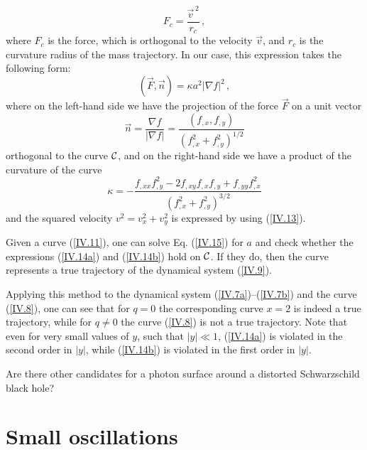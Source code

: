 \documentclass[twocolumn,showpacs,preprintnumbers,amsmath,amssymb,floatfix,nofootinbib]{revtex4-1}
\newcommand{\be}{\begin{equation}}
\newcommand{\ee}{\end{equation}}
\newcommand{\eq}[1]{(\ref{#1})}
\newcommand{\n}[1]{\label{#1}}
\begin{document}
\be\n{IV.16}
F_{c}=\frac{\vec{v}^{\,2}}{r_{c}}\,,
\ee
where $F_{c}$ is the force, which is orthogonal to the velocity $\vec{v}$, and $r_{c}$ is the curvature radius of the mass trajectory. In our case, this expression takes the following form:
\be\n{IV.17}
(\vec{F},\vec{n})=\kappa a^2|\nabla f|^2\,,
\ee
where on the left-hand side we have the projection of the force $\vec{F}$ on a unit vector 
\be\n{IV.18}
\vec{n}=\frac{\nabla f}{|\nabla f|}=\frac{(f_{,x}, f_{,y})}{(f_{,x}^2+f_{,y}^2)^{1/2}}
\ee
orthogonal to the curve ${\cal C}$, and on the right-hand side we have a product of the curvature of the curve 
\be\n{IV.19}
\kappa=-\frac{f_{,xx}f_{,y}^2-2f_{,xy}f_{,x}f_{,y}+f_{,yy}f_{,x}^2}{(f_{,x}^2+f_{,y}^2)^{3/2}} 
\ee
and the squared velocity $v^2=v_x^2+v_y^2$ is expressed by using \eq{IV.13}.

Given a curve \eq{IV.11}, one can solve Eq. \eq{IV.15} for $a$ and check whether the expressions \eq{IV.14a} and \eq{IV.14b} hold on ${\cal C}$. If they do, then the curve represents a true trajectory of the dynamical system \eq{IV.9}. 
 
Applying this method to the dynamical system \eq{IV.7a}--\eq{IV.7b} and the curve \eq{IV.8}, one can see that for $q=0$ the corresponding curve $x=2$ is indeed a true trajectory, while for $q\ne0$ the curve \eq{IV.8} is not a true trajectory. Note that even for very small values of $y$, such that $|y|\ll1$, \eq{IV.14a} is violated in the second order in $|y|$, while \eq{IV.14b} is violated in the first order in $|y|$. 

Are there other candidates for a photon surface around a distorted Schwarzschild black hole? 

\section{Small oscillations}
\end{document}
